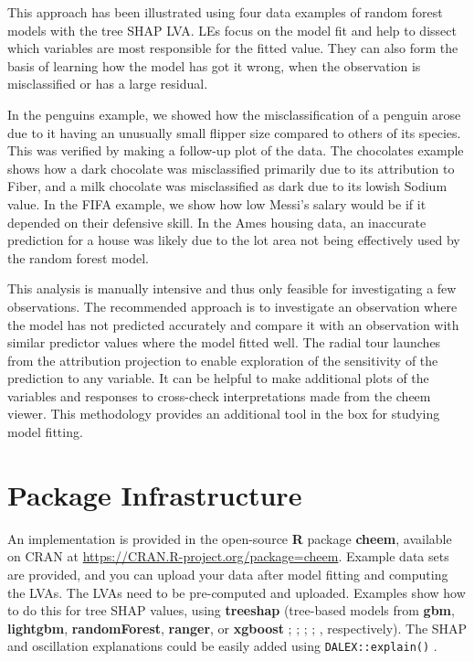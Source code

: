 \documentclass[
]{sn-jnl}
\begin{document}
This approach has been illustrated using four data examples of random
forest models with the tree SHAP LVA. LEs focus on the model fit and
help to dissect which variables are most responsible for the fitted
value. They can also form the basis of learning how the model has got it
wrong, when the observation is misclassified or has a large residual.

In the penguins example, we showed how the misclassification of a
penguin arose due to it having an unusually small flipper size compared
to others of its species. This was verified by making a follow-up plot
of the data. The chocolates example shows how a dark chocolate was
misclassified primarily due to its attribution to Fiber, and a milk
chocolate was misclassified as dark due to its lowish Sodium value. In
the FIFA example, we show how low Messi's salary would be if it depended
on their defensive skill. In the Ames housing data, an inaccurate
prediction for a house was likely due to the lot area not being
effectively used by the random forest model.

This analysis is manually intensive and thus only feasible for
investigating a few observations. The recommended approach is to
investigate an observation where the model has not predicted accurately
and compare it with an observation with similar predictor values where
the model fitted well. The radial tour launches from the attribution
projection to enable exploration of the sensitivity of the prediction to
any variable. It can be helpful to make additional plots of the
variables and responses to cross-check interpretations made from the
cheem viewer. This methodology provides an additional tool in the box
for studying model fitting.

\hypertarget{sec:infrastructure}{%
\section{Package Infrastructure}\label{sec:infrastructure}}

An implementation is provided in the open-source \textbf{R} package
\textbf{cheem}, available on CRAN at
\url{https://CRAN.R-project.org/package=cheem}. Example data sets are
provided, and you can upload your data after model fitting and computing
the LVAs. The LVAs need to be pre-computed and uploaded. Examples show
how to do this for tree SHAP values, using \textbf{treeshap} (tree-based
models from \textbf{gbm}, \textbf{lightgbm}, \textbf{randomForest},
\textbf{ranger}, or \textbf{xgboost} \citet{greenwell_gbm_2020};
\citet{shi_lightgbm_2022}; \citet{liaw_classification_2002};
\citet{wright_ranger_2017}; \citet{chen_xgboost_2021}, respectively).
The SHAP and oscillation explanations could be easily added using
\texttt{DALEX::explain()}
\citep{biecek_dalex_2018, biecek_explanatory_2021}.
\end{document}
